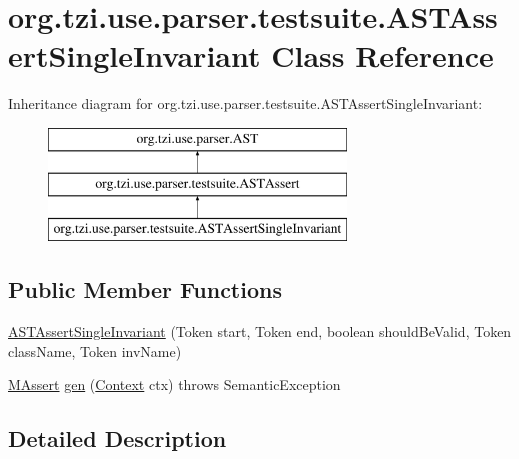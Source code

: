 \hypertarget{classorg_1_1tzi_1_1use_1_1parser_1_1testsuite_1_1_a_s_t_assert_single_invariant}{\section{org.\-tzi.\-use.\-parser.\-testsuite.\-A\-S\-T\-Assert\-Single\-Invariant Class Reference}
\label{classorg_1_1tzi_1_1use_1_1parser_1_1testsuite_1_1_a_s_t_assert_single_invariant}
}
Inheritance diagram for org.\-tzi.\-use.\-parser.\-testsuite.\-A\-S\-T\-Assert\-Single\-Invariant\-:\begin{figure}[H]
\begin{center}
\leavevmode
\includegraphics[height=3.000000cm]{classorg_1_1tzi_1_1use_1_1parser_1_1testsuite_1_1_a_s_t_assert_single_invariant}
\end{center}
\end{figure}
\subsection*{Public Member Functions}
\begin{DoxyCompactItemize}
\item 
\hyperlink{classorg_1_1tzi_1_1use_1_1parser_1_1testsuite_1_1_a_s_t_assert_single_invariant_ac7cdbc3760f38a4130493e11a5ae8331}{A\-S\-T\-Assert\-Single\-Invariant} (Token start, Token end, boolean should\-Be\-Valid, Token class\-Name, Token inv\-Name)
\item 
\hyperlink{classorg_1_1tzi_1_1use_1_1uml_1_1sys_1_1testsuite_1_1_m_assert}{M\-Assert} \hyperlink{classorg_1_1tzi_1_1use_1_1parser_1_1testsuite_1_1_a_s_t_assert_single_invariant_ae7884a55308861ea5c11843c00da8f97}{gen} (\hyperlink{classorg_1_1tzi_1_1use_1_1parser_1_1_context}{Context} ctx)  throws Semantic\-Exception 
\end{DoxyCompactItemize}


\subsection{Detailed Description}


